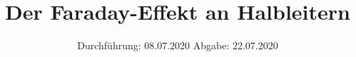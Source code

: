 

\subject{Nr. 46}
\title{Der Faraday-Effekt an Halbleitern}
\date{%
  Durchführung: 08.07.2020
  \hspace{3em}
  Abgabe: 22.07.2020
}



\maketitle
\thispagestyle{empty}
\tableofcontents
\newpage






\printbibliography{}



